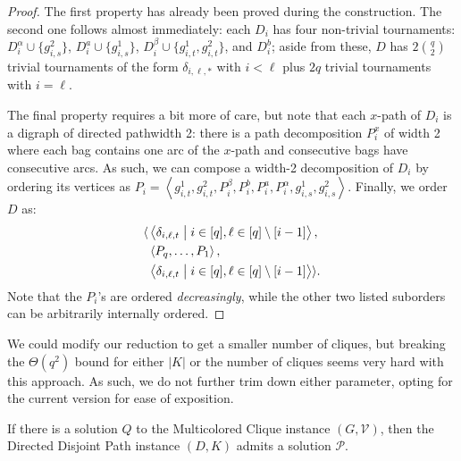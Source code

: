\documentclass[a4paper,UKenglish,cleveref, autoref, thm-restate]{lipics-v2021}
\renewcommand{\mid}{\bigm|}
\newcommand{\angled}[1]{\left\langle{#1}\right\rangle}
\newcommand{\pname}[1]{{\sc #1}}
\begin{document}
    \begin{proof}
      The first property has already been proved during the construction.
      The second one follows almost immediately: each $D_i$ has four non-trivial tournaments:
      $D_i^\alpha \cup \{g^2_{i, s}\}$, $D_{i}^a \cup \{g^1_{i, s}\}$, $D_{i}^\beta \cup
      \{g^1_{i, t}, g^2_{i, t}\}$, and $D_{i}^b$; aside from these, $D$ has
      $2\binom{q}{2}$ trivial tournaments of the form
      $\delta_{i, \ell, *}$ with $i < \ell$ plus $2q$ trivial tournaments with $i = \ell$.

      The final property requires a bit more of care, but note that each $x$-path of
      $D_i$ is a digraph of directed pathwidth 2: there is a path decomposition $P_{i}^x$ of width
      2 where each bag contains one arc of the $x$-path and consecutive bags have consecutive arcs.
      As such, we can compose a width-2 decomposition of $D_i$ by ordering its vertices
      as $P_i = \angled{g_{i,t}^1, g_{i,t}^2, P_i^\beta, P_i^b, P_i^a, P_i^\alpha,
      g_{i,s}^1, g_{i,s}^2}$.
      Finally, we order $D$ as:
      \begin{align*}
        \langle&\angled{\delta_{i,\ell,t} \mid i \in [q], \ell \in [q] \setminus[i-1]},\\
        &\angled{P_q, \dots, P_1},\\
        &\angled{\delta_{i,\ell,t} \mid i \in [q], \ell \in [q] \setminus [i-1]} \rangle.
      \end{align*}
      Note that the $P_i$'s are ordered \textit{decreasingly}, while the other two listed
      suborders can be arbitrarily internally ordered.
    \end{proof}

    We could modify our reduction to get a smaller number of cliques, but breaking the
    $\Theta(q^2)$ bound for either $|K|$ or the number of cliques seems very hard with
    this approach.
    As such, we do not further trim down either parameter, opting for the current version
    for ease of exposition.

    \begin{lemma}
      \label{lem:slivkins_forward}
      If there is a solution $Q$ to the \pname{Multicolored Clique} instance $(G,
      \mathcal{V})$, then the \pname{Directed Disjoint Path} instance $(D, K)$ admits a
      solution $\mathcal{P}$.
    \end{lemma}
\end{document}
